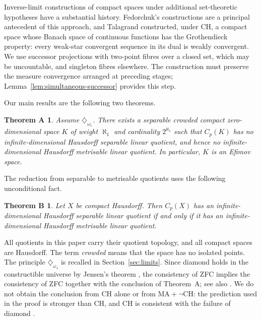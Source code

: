 \documentclass[a4paper,11pt]{amsart}
\theoremstyle{plain}
\newtheorem*{theoremA}{Theorem A}
\newtheorem*{theoremB}{Theorem B}
\theoremstyle{definition}
\theoremstyle{remark}
\numberwithin{equation}{section}
\begin{document}
Inverse-limit constructions of compact spaces under additional set-theoretic hypotheses have a substantial history. Fedorchuk's constructions \cite{Fedorchuk} are a principal antecedent of this approach, and Talagrand \cite{Talagrand} constructed, under CH, a compact space whose Banach space of continuous functions has the Grothendieck property: every weak-star convergent sequence in its dual is weakly convergent. We use successor projections with two-point fibres over a closed set, which may be uncountable, and singleton fibres elsewhere. The construction must preserve the measure convergence arranged at preceding stages; Lemma~\ref{lem:simultaneous-successor} provides this step.

Our main results are the following two theorems.

\begin{theoremA}
Assume $\diamondsuit_{\omega_1}$. There exists a separable crowded compact zero-dimensional space $K$ of weight $\aleph_1$ and cardinality $2^{\aleph_1}$ such that $C_p(K)$ has no infinite-dimensional Hausdorff separable linear quotient, and hence no infinite-dimensional Hausdorff metrisable linear quotient. In particular, $K$ is an Efimov space.
\end{theoremA}

The reduction from separable to metrisable quotients uses the following unconditional fact.

\begin{theoremB}
Let $X$ be compact Hausdorff. Then $C_p(X)$ has an infinite-dimensional Hausdorff separable linear quotient if and only if it has an infinite-dimensional Hausdorff metrisable linear quotient.
\end{theoremB}

All quotients in this paper carry their quotient topology, and all compact spaces are Hausdorff. The term \emph{crowded} means that the space has no isolated points. The principle $\diamondsuit_{\omega_1}$ is recalled in Section~\ref{sec:limits}. Since diamond holds in the constructible universe by Jensen's theorem \cite{Jensen}, the consistency of ZFC implies the consistency of ZFC together with the conclusion of Theorem~A; see also \cite[Theorem~1.2]{Rinot}. We do not obtain the conclusion from CH alone or from $\mathrm{MA}+\neg\mathrm{CH}$: the prediction used in the proof is stronger than CH, and CH is consistent with the failure of diamond \cite[Theorem~1.4]{Rinot}.
\end{document}
